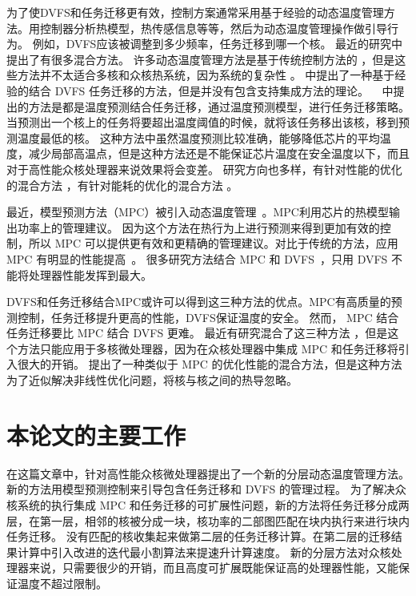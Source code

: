  为了使DVFS和任务迁移更有效，控制方案通常采用基于经验的动态温度管理方法。用控制器分析热模型，热传感信息等等，然后为动态温度管理操作做引导行为。
 例如，DVFS应该被调整到多少频率，任务迁移到哪一个核。
 最近的研究中提出了有很多混合方法。
 许多动态温度管理方法是基于传统控制方法的 \cite{Kadin:GLSVLSI'09}，但是这些方法并不太适合多核和众核热系统，因为系统的复杂性 \cite{Bartolini:TPDS'13}。 
 \cite{Brooks:HPCA'04}中提出了一种基于经验的结合 DVFS 任务迁移的方法，但是并没有包含支持集成方法的理论。
 ~\cite{yeo2008predictive,coskun2008proactive} 中提出的方法是都是温度预测结合任务迁移，通过温度预测模型，进行任务迁移策略。
 当预测出一个核上的任务将要超出温度阈值的时候，就将该任务移出该核，移到预测温度最低的核。
 这种方法中虽然温度预测比较准确，能够降低芯片的平均温度，减少局部高温点，但是这种方法还是不能保证芯片温度在安全温度以下，而且对于高性能众核处理器来说效果将会变差。
 研究方向也多样，有针对性能的优化的混合方法 \cite{Hanumaiah:TCAD'11}，有针对能耗的优化的混合方法 \cite{Hanumaiah:TCOMP'14,Tan:ASPDAC'15}。
 
 最近，模型预测方法（MPC）被引入动态温度管理~\cite{Zanini:ECCTD'09,Wang:ISCA'09,Bartolini:TPDS'13}。MPC利用芯片的热模型输出功率上的管理建议。
 因为这个方法在热行为上进行预测来得到更加有效的控制，所以 MPC 可以提供更有效和更精确的管理建议。对比于传统的方法，应用 MPC 有明显的性能提高~\cite{Bartolini:TPDS'13}。
 很多研究方法结合 MPC 和 DVFS~\cite{Zanini:ECCTD'09,Wang:ISCA'09,Bartolini:TPDS'13}，只用 DVFS 不能将处理器性能发挥到最大。
 
 DVFS和任务迁移结合MPC或许可以得到这三种方法的优点。MPC有高质量的预测控制，任务迁移提升更高的性能，DVFS保证温度的安全。
 然而， MPC 结合任务迁移要比 MPC 结合 DVFS 更难。
 最近有研究混合了这三种方法 \cite{MaWang:APCCAS'14}，但是这个方法只能应用于多核微处理器，因为在众核处理器中集成 MPC 和任务迁移将引入很大的开销。
 \cite{Hanumaiah:TCAD'11} 提出了一种类似于 MPC 的优化性能的混合方法，但是这种方法为了近似解决非线性优化问题，将核与核之间的热导忽略。
 
 \section{本论文的主要工作}\label{sec:thispaper}
在这篇文章中，针对高性能众核微处理器提出了一个新的分层动态温度管理方法。
新的方法用模型预测控制来引导包含任务迁移和 DVFS 的管理过程。
为了解决众核系统的执行集成 MPC 和任务迁移的可扩展性问题，新的方法将任务迁移分成两层，在第一层，相邻的核被分成一块，核功率的二部图匹配在块内执行来进行块内任务迁移。
没有匹配的核收集起来做第二层的任务迁移计算。在第二层的迁移结果计算中引入改进的迭代最小割算法来提速升计算速度。
新的分层方法对众核处理器来说，只需要很少的开销，而且高度可扩展既能保证高的处理器性能，又能保证温度不超过限制。

